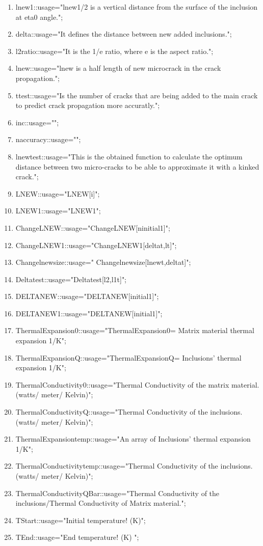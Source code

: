 \documentclass[12pt]{article}
\numberwithin{equation}{subsection}
\begin{document}
\begin{enumerate}
\item lnew1::usage="lnew1/2 is a vertical distance from the surface of the inclusion at eta0 angle."; 
\item delta::usage="It defines the distance between new added inclusions.";
\item l2ratio::usage="It is the 1/e ratio, where e is the aspect ratio.";
\item lnew::usage="lnew is a half length of new microcrack in the crack propagation."; 
\item ttest::usage="Is the number of cracks that are being added to the main crack to predict crack propagation more accuratly.";
\item inc::usage="";
\item naccuracy::usage="";
\item lnewtest::usage="This is the obtained function to calculate the optimum distance between 
two micro-cracks to be able to approximate it with a kinked crack.";
\item LNEW::usage="LNEW[i]";
\item LNEW1::usage="LNEW1";
\item ChangeLNEW::usage="ChangeLNEW[ninitial1]";
\item ChangeLNEW1::usage="ChangeLNEW1[deltat,lt]";
\item Changelnewsize::usage=" Changelnewsize[lnewt,deltat]";
\item Deltatest::usage="Deltatest[l2,l1t]";
\item DELTANEW::usage="DELTANEW[initial1]";
\item DELTANEW1::usage="DELTANEW[initial1]";

\item ThermalExpansion0::usage="ThermalExpansion0= Matrix material thermal expansion 1/K";
\item ThermalExpansionQ::usage="ThermalExpansionQ= Inclusions' thermal expansion 1/K";
\item ThermalConductivity0::usage="Thermal Conductivity of the matrix material. (watts/ meter/ Kelvin)";
\item ThermalConductivityQ::usage="Thermal Conductivity of the inclusions. (watts/ meter/ Kelvin)";
\item ThermalExpansiontemp::usage="An array of Inclusions' thermal expansion 1/K";
\item ThermalConductivitytemp::usage="Thermal Conductivity of the inclusions. (watts/ meter/ Kelvin)";
\item ThermalConductivityQBar::usage="Thermal Conductivity of the inclusions/Thermal Conductivity of Matrix material.";
\item TStart::usage="Initial temperature! (K)";
\item TEnd::usage="End temperature! (K) ";


\end{enumerate}
\end{document}
